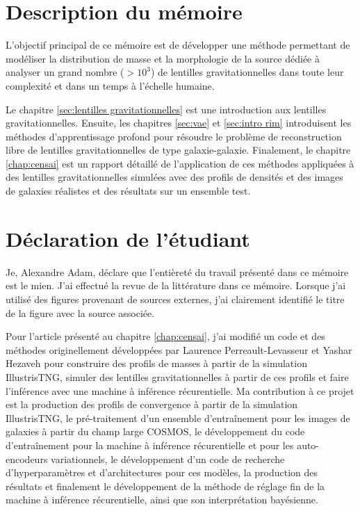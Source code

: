 \section{Description du mémoire}

L'objectif principal de ce mémoire est de développer une méthode permettant de 
modéliser la distribution de masse et 
la morphologie de la source dédiée à analyser un grand nombre ($> 10^{3}$)
de lentilles gravitationnelles dans toute leur complexité et dans un temps à l'échelle humaine. 

Le chapitre \ref{sec:lentilles gravitationnelles} est une introduction aux lentilles gravitationnelles. Ensuite, 
les chapitres \ref{sec:vae} et \ref{sec:intro rim} introduisent les méthodes d'apprentissage profond 
pour résoudre le problème de reconstruction libre de lentilles gravitationnelles de type galaxie-galaxie. 
Finalement, le chapitre \ref{chap:censai} est un rapport détaillé de l'application de ces méthodes 
appliquées à des lentilles gravitationnelles simulées 
avec des profils de densités et des images de galaxies réalistes 
et des résultats sur un ensemble test. 

\section{Déclaration de l'étudiant}
Je, Alexandre Adam, déclare que l'entièreté du travail présenté dans ce mémoire est le mien. J'ai effectué la revue de 
la littérature dans ce mémoire. Lorsque j'ai utilisé des figures provenant de sources externes, j'ai clairement 
identifié le titre de la figure avec la source associée.

Pour l'article présenté au chapitre \ref{chap:censai}, j'ai modifié un code et des méthodes originellement 
développées par Laurence Perreault-Levasseur et Yashar Hezaveh pour construire des profils de masses à partir 
de la simulation IllustrisTNG, simuler des lentilles gravitationnelles à partir de ces profils et faire l'inférence avec une 
machine à inférence récurentielle. Ma contribution à ce projet est la 
production des profils de convergence à partir de la simulation IllustrisTNG, le pré-traitement 
d'un ensemble d'entraînement pour les images de galaxies à partir du champ large COSMOS, le 
développement du code d'entraînement pour la machine à inférence récurentielle et pour les auto-encodeurs 
variationnels, le développement d'un code de recherche d'hyperparamètres et d'architectures pour ces modèles, 
la production des résultats et finalement 
le développement de la méthode de réglage fin de la machine à inférence récurentielle, 
ainsi que son interprétation bayésienne.

